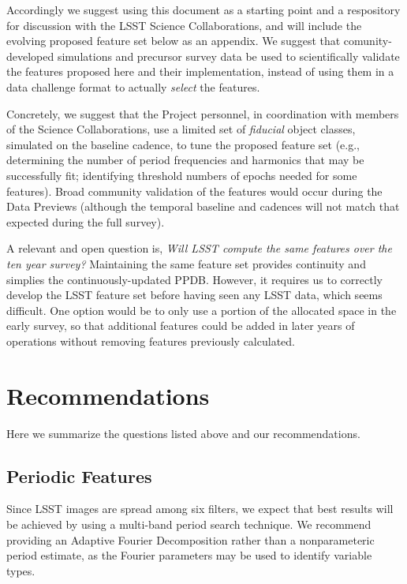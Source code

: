 \documentclass[DM,authoryear,toc]{lsstdoc}
\begin{document}
Accordingly we suggest using this document as a starting point and a respository for discussion with the LSST Science Collaborations, and will include the evolving proposed feature set below as an appendix.
We suggest that comunity-developed simulations and precursor survey data be used to scientifically validate the features proposed here and their implementation, instead of using them in a data challenge format to actually \textit{select} the features. 

Concretely, we suggest that the Project personnel, in coordination with members of the Science Collaborations, use a limited set of \textit{fiducial} object classes, simulated on the baseline cadence, to tune the proposed feature set (e.g., determining the number of period frequencies and harmonics that may be successfully fit; identifying threshold numbers of epochs needed for some features).
Broad community validation of the features would occur during the Data Previews (although the temporal baseline and cadences will not match that expected during the full survey).

A relevant and open question is, \textit{Will LSST compute the same features over the ten year survey?}
Maintaining the same feature set provides continuity and simplies the continuously-updated PPDB.
However, it requires us to correctly develop the LSST feature set before having seen any LSST data, which seems difficult.
One option would be to only use a portion of the allocated space in the early survey, so that additional features could be added in later years of operations without removing features previously calculated.

\section{Recommendations}

Here we summarize the questions listed above and our recommendations.

\subsection{Periodic Features}

Since LSST images are spread among six filters, we expect that best results will be achieved by using a multi-band period search technique.
We recommend providing an Adaptive Fourier Decomposition rather than a nonparameteric period estimate, as the Fourier parameters may be used to identify variable types.
\end{document}
